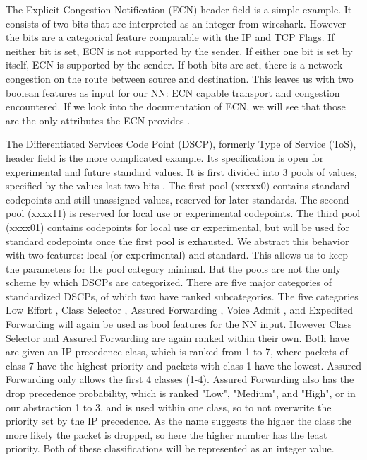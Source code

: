 \documentclass[
	ngerman,
	ruledheaders=section,%
	class=report,%
	thesis={type=bachelor},%
	accentcolor=9c,%
	custommargins=true,%
	marginpar=false,%
	parskip=half-,%
	fontsize=11pt,%
]{tudapub}
\begin{document}
The Explicit Congestion Notification (ECN) \cite{floydAdditionExplicitCongestion} header field is a simple example.
It consists of two bits that are interpreted as an integer from wireshark.
However the bits are a categorical feature comparable with the IP and TCP Flags.
If neither bit is set, ECN is not supported by the sender.
If either one bit is set by itself, ECN is supported by the sender.
If both bits are set, there is a network congestion on the route between source and destination.
This leaves us with two boolean features as input for our NN: ECN capable transport and congestion encountered.
If we look into the documentation of ECN, we will see that those are the only attributes the ECN provides \cite{DifferentiatedServicesField}.

The Differentiated Services Code Point (DSCP), formerly Type of Service (ToS), header field is the more complicated example.
Its specification is open for experimental and future standard values.
It is first divided into 3 pools of values, specified by the values last two bits \cite{DifferentiatedServicesField}.
The first pool (xxxxx0) contains standard codepoints and still unassigned values, reserved for later standards.
The second pool (xxxx11) is reserved for local use or experimental codepoints.
The third pool (xxxx01) contains codepoints for local use or experimental, but will be used for standard codepoints once the first pool is exhausted.
We abstract this behavior with two features: local (or experimental) and standard.
This allows us to keep the parameters for the pool category minimal.
But the pools are not the only scheme by which DSCPs are categorized.
There are five major categories of standardized DSCPs, of which two have ranked subcategories.
The five categories Low Effort \cite{blessLowerEffortPerHopBehavior}, Class Selector \cite{nicholsDefinitionDifferentiatedServices}, Assured Forwarding \cite{wroclawskiAssuredForwardingPHB}, Voice Admit \cite{bakerDifferentiatedServicesCode}, and Expedited Forwarding \cite{firoiuExpeditedForwardingPHB} will again be used as bool features for the NN input.
However Class Selector and Assured Forwarding are again ranked within their own.
Both have are given an IP precedence class, which is ranked from 1 to 7, where packets of class 7 have the highest priority and packets with class 1 have the lowest.
Assured Forwarding only allows the first 4 classes (1-4).
Assured Forwarding also has the drop precedence probability, which is ranked "Low", "Medium", and "High", or in our abstraction 1 to 3, and is used within one class, so to not overwrite the priority set by the IP precedence.
As the name suggests the higher the class the more likely the packet is dropped, so here the higher number has the least priority.
Both of these classifications will be represented as an integer value.
\end{document}
